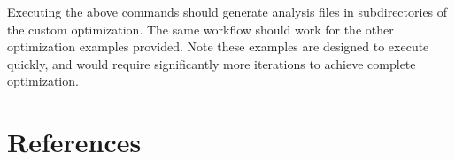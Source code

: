 \documentclass[12pt]{article}
\begin{document}
Executing the above commands should generate analysis files in subdirectories of the custom optimization.  The same workflow should work for the other optimization examples provided.  Note these examples are designed to execute quickly, and would require significantly more iterations to achieve complete optimization.

\section{References}
\begingroup
\renewcommand{\section}[2]{}


\endgroup
\end{document}
